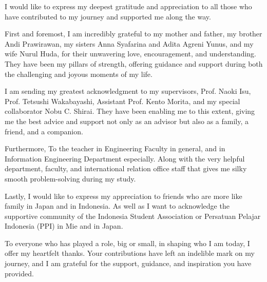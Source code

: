 

\begin{acknowledgements}      %

I would like to express my deepest gratitude and appreciation to all those who have contributed to my journey and supported me along the way.

First and foremost, I am incredibly grateful to my mother and father, my brother Andi Prawirawan,  my sisters Anna Syafarina and Adita Agreni Yunus, and my wife Nurul Huda, for their unwavering love, encouragement, and understanding. They have been my pillars of strength, offering guidance and support during both the challenging and joyous moments of my life.

I am sending my greatest acknowledgment to my supervisors, Prof. Naoki Isu, Prof. Tetsushi Wakabayashi,  Assistant Prof. Kento Morita, and my special collaborator Nobu C. Shirai. They have been enabling me to this extent, giving me the best advice and support not only as an advisor but also as a family, a friend, and a companion.

Furthermore, To the teacher in Engineering Faculty in general, and in Information Engineering Department especially. Along with the very helpful department, faculty, and international relation office staff that gives me silky smooth problem-solving during my study.

Lastly, I would like to express my appreciation to friends who are more like family in Japan and in Indonesia. As well as I want to acknowledge the supportive community of the Indonesia Student Association or Persatuan Pelajar Indonesia (PPI) in Mie and in Japan.

To everyone who has played a role, big or small, in shaping who I am today, I offer my heartfelt thanks. Your contributions have left an indelible mark on my journey, and I am grateful for the support, guidance, and inspiration you have provided.

\end{acknowledgements}



